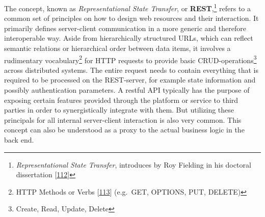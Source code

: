 \documentclass[12pt,english,a4paper,titlepage,cleardoublepage=empty,dottedtoc]{report}
\begin{document}
The concept, known as \emph{Representational State Transfer}, or
\textbf{REST},\footnote{\emph{Representational State Transfer},
  introduces by Roy Fielding in his doctoral dissertation
  {[}\protect\hyperlink{ref-web_spec_rest}{112}{]}} refers to a common
set of principles on how to design web resources and their interaction.
It primarily defines server-client communication in a more generic and
therefore interoperable way. Aside from hierarchically structured URLs,
which can reflect semantic relations or hierarchical order between data
items, it involves a rudimentary vocabulary\footnote{HTTP Methods or
  Verbs {[}\protect\hyperlink{ref-web_spec_http-methods}{113}{]}
  (e.g.~GET, OPTIONS, PUT, DELETE)} for HTTP requests to provide basic
CRUD-operations\footnote{Create, Read, Update, Delete} across
distributed systems. The entire request needs to contain everything that
is required to be processed on the REST-server, for example state
information and possibly authentication parameters. A restful API
typically has the purpose of exposing certain features provided through
the platform or service to third parties in order to synergistically
integrate with them. But utilizing these principals for all internal
server-client interaction is also very common. This concept can also be
understood as a proxy to the actual business logic in the back end.
\end{document}
